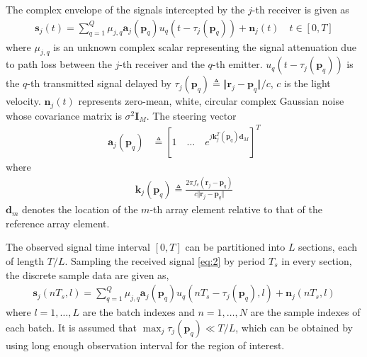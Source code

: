 \documentclass[journal,10pt]{IEEEtran}
\begin{document}
The complex envelope of the signals intercepted by the $j$-th receiver is given as
\begin{align}\label{eq:2}
    \boldsymbol{s}_j(t)= \sum_{q=1}^{Q}\mu_{j,q} \boldsymbol{a}_j(\boldsymbol{p}_q)u_q(t-\tau_j(\boldsymbol{p}_q))+\boldsymbol{n}_j(t) \quad t\in [0,T]  
\end{align}
where $\mu_{j,q} $ is an unknown complex scalar representing the signal attenuation due to path loss between 
the $j$-th receiver and the $q$-th emitter. $u_q(t-\tau_j(\boldsymbol{p}_q))$ is the $q$-th transmitted signal delayed by $\tau_j(\boldsymbol{p}_q)\triangleq\Vert\boldsymbol{r}_j-\boldsymbol{p}_q\Vert/c$, $c$ is the light velocity.
$\boldsymbol{n}_j(t)$ represents zero-mean, white, circular complex Gaussian noise whose covariance matrix is $\sigma^2\boldsymbol{I}_M$. %
The steering vector 
\begin{align}\label{eq:3}
    \boldsymbol{a}_j(\boldsymbol{p}_q)&\triangleq [1 \quad \dots \quad e^{j\boldsymbol{k}^T_j(\boldsymbol{p}_q)\boldsymbol{d}_M}]^T
\end{align} 
where 
\begin{align}\label{eq:4}
    \boldsymbol{k}_j(\boldsymbol{p}_q)\triangleq \frac{2\pi f_c(\boldsymbol{r}_j-\boldsymbol{p}_q) }{c\Vert\boldsymbol{r}_j-\boldsymbol{p}_q \Vert} 
\end{align} 
$\boldsymbol{d}_m$ denotes the location of the $m$-th array element relative to that of the reference array element.

The observed signal time interval $[0,T]$ can be partitioned into $L$ sections, each of length $T/L$. Sampling the received signal \eqref{eq:2} by period $T_s$ in every section, the discrete sample data are given as,
\begin{align}\label{eq:5}
    \boldsymbol{s}_j(nT_s,l)=\sum_{q=1}^{Q} \mu_{j,q} \boldsymbol{a}_j(\boldsymbol{p}_q)u_q(nT_s-\tau_j(\boldsymbol{p}_q),l)+\boldsymbol{n}_j(nT_s,l)
\end{align}
where $l=1,\dots,L$ are the batch indexes and $n=1,\dots,N$ are the sample indexes of each batch. It is assumed that $\max_j \tau_j(\boldsymbol{p}_q)\ll T/L$, which can be obtained by using long enough observation interval for 
the region of interest. 
\end{document}
